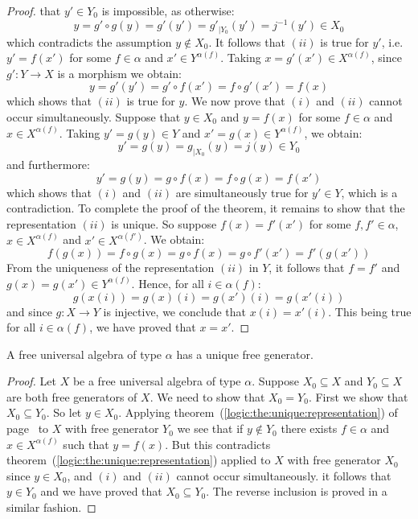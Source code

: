 \begin{proof}
that $y'\in Y_{0}$ is impossible, as otherwise:
    \[
    y=g'\circ g(y)=g'(y')=g'_{|Y_{0}}(y')=j^{-1}(y')\in X_{0}
    \]
which contradicts the assumption $y\not\in X_{0}$. It follows that
$(ii)$ is true for $y'$, i.e. $y'=f(x')$ for some $f\in\alpha$ and
$x'\in Y^{\alpha(f)}$. Taking $x=g'(x')\in X^{\alpha(f)}$, since
$g':Y\to X$ is a morphism we obtain:
    \[
    y = g'(y')=g'\circ f(x')=f\circ g'(x')=f(x)
    \]
which shows that $(ii)$ is true for $y$. We now prove that $(i)$ and
$(ii)$ cannot occur simultaneously. Suppose that $y\in X_{0}$ and
$y=f(x)$ for some $f\in\alpha$ and $x\in X^{\alpha(f)}$. Taking
$y'=g(y)\in Y$  and $x'=g(x)\in Y^{\alpha(f)}$, we obtain:
    \[
    y' = g(y)=g_{|X_{0}}(y)=j(y)\in Y_{0}
    \]
and furthermore:
    \[
    y' = g(y)=g\circ f (x)=f\circ g(x)=f(x')
    \]
which shows that $(i)$ and $(ii)$ are simultaneously true for $y'\in
Y$, which is a contradiction. To complete the proof of the theorem,
it remains to show that the representation $(ii)$ is unique. So
suppose $f(x)=f'(x')$ for some $f,f'\in\alpha$, $x\in X^{\alpha(f)}$
and $x'\in X^{\alpha(f')}$. We obtain:
    \[
    f(g(x)) = f\circ g(x)=g\circ f(x)=g\circ f'(x') = f'(g(x'))
    \]
From the uniqueness of the representation $(ii)$ in $Y$, it follows
that $f=f'$ and $g(x)=g(x')\in Y^{\alpha(f)}$. Hence, for all
$i\in\alpha(f)$:
    \[
    g(x(i))=g(x)(i)=g(x')(i)=g(x'(i))
    \]
and since $g:X\to Y$ is injective, we conclude that $x(i)=x'(i)$.
This being true for all $i\in\alpha(f)$, we have proved that $x=x'$.
\end{proof}
\begin{prop}
A free universal algebra of type $\alpha$ has a unique free generator.
\end{prop}
\begin{proof}
Let $X$ be a free universal algebra of type $\alpha$. Suppose
$X_{0}\subseteq X$ and $Y_{0}\subseteq X$ are both free generators
of $X$. We need to show that $X_{0}=Y_{0}$. First we show that
$X_{0}\subseteq Y_{0}$. So let $y\in X_{0}$. Applying
theorem~(\ref{logic:the:unique:representation}) of
page~\pageref{logic:the:unique:representation} to $X$ with free
generator $Y_{0}$ we see that if $y\not\in Y_{0}$ there exists
$f\in\alpha$ and $x\in X^{\alpha(f)}$ such that $y=f(x)$. But this
contradicts theorem~(\ref{logic:the:unique:representation}) applied
to $X$ with free generator $X_{0}$ since $y\in X_{0}$, and $(i)$ and
$(ii)$ cannot occur simultaneously. it follows that $y\in Y_{0}$ and
we have proved that $X_{0}\subseteq Y_{0}$. The reverse inclusion is
proved in a similar fashion.
\end{proof}
